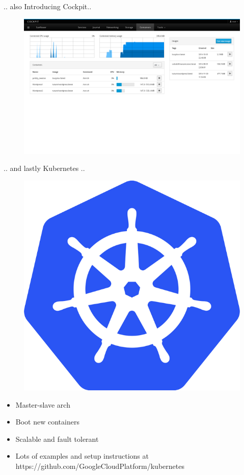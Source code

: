\documentclass{beamer}
\begin{document}
\begin{frame}{.. also Introducing Cockpit..}
\begin{figure}[htp]
\centering
\includegraphics[scale=0.28]{cockpit.png}
\label{}
\end{figure}
\end{frame}

\begin{frame}{.. and lastly Kubernetes ..}
\begin{figure}[htp]
\centering
\includegraphics[scale=0.2]{kubernetes.png}
\label{}
\end{figure}
\begin{itemize}
  \item Master-slave arch
  \item Boot new containers
  \item Scalable and fault tolerant 
  \item Lots of examples and setup instructions at https://github.com/GoogleCloudPlatform/kubernetes
\end{itemize}
\end{frame}
\end{document}
